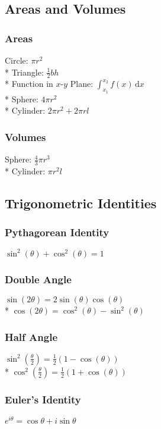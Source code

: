 \subsection{Areas and Volumes}

\subsubsection{Areas}
Circle: \(\pi r^2\)\\*
Triangle: \(\frac{1}{2}bh\)\\*
Function in \(x\)-\(y\) Plane: \(\int_{x_1}^{x_2}f(x)\,\mathrm{d}x\)\\*
Sphere: \(4\pi r^2\)\\*
Cylinder: \(2\pi r^2+2\pi rl\)

\subsubsection{Volumes}
Sphere: \(\frac{4}{3}\pi r^3\)\\*
Cylinder: \(\pi r^2l\)

\subsection{Trigonometric Identities}

\subsubsection{Pythagorean Identity}
\(\sin^2(\theta)+\cos^2(\theta)=1\)

\subsubsection{Double Angle}
\(\sin(2\theta)=2\sin(\theta)\cos(\theta)\)\\*
\(\cos(2\theta)=\cos^2(\theta)-\sin^2(\theta)\)

\subsubsection{Half Angle}
\(\sin^2\left(\frac{\theta}{2}\right)=\frac{1}{2}\left(1-\cos(\theta)\right)\)\\*
\(\cos^2\left(\frac{\theta}{2}\right)=\frac{1}{2}\left(1+\cos(\theta)\right)\)

\subsubsection{Euler's Identity}
\(e^{i\theta}=\cos{\theta}+i\sin{\theta}\)

